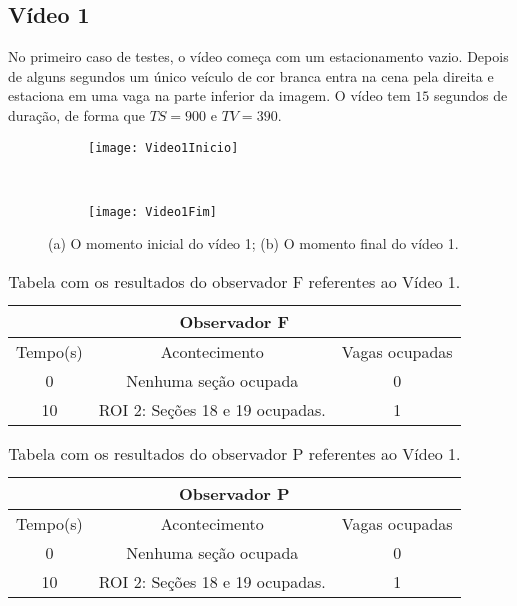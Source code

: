 \subsection{Vídeo 1}

No primeiro caso de testes, o vídeo começa com um estacionamento vazio. Depois de alguns segundos um único veículo de cor branca entra na cena pela direita e estaciona em uma vaga na parte inferior da imagem. O vídeo tem $15$ segundos de duração, de forma que $TS = 900$ e $TV = 390$.

\begin{figure}[H]
\centering
\begin{subfigure}{.5\textwidth}
\centering
\texttt{[image: Video1Inicio]}
\caption{}
\end{subfigure}\
\begin{subfigure}{.5\textwidth}
\centering
\texttt{[image: Video1Fim]}
\caption{}
\end{subfigure}
\centering
\caption{(a) O momento inicial do vídeo 1; (b) O momento final do vídeo 1.}%
\label{}%
\end{figure}

\begin{table}[H]
\begin{center}
\begin{tabular}{|c||c||c|}
\hline
\multicolumn{3}{|c|}{Observador F}  \\ \hline \hline
Tempo(s) & Acontecimento & Vagas ocupadas\\ \hline
0 & Nenhuma seção ocupada & 0 \\ \hline
10 & ROI 2: Seções 18 e 19 ocupadas. & 1 \\
\hline
\end{tabular}
\caption{Tabela com os resultados do observador F referentes ao Vídeo 1.}
\label{tab:video1F}
\end{center}
\end{table}

\begin{table}[H]
\begin{center}
\begin{tabular}{|c||c||c|}
\hline
\multicolumn{3}{|c|}{Observador P}  \\ \hline \hline
Tempo(s) & Acontecimento & Vagas ocupadas\\ \hline
0 & Nenhuma seção ocupada & 0 \\ \hline
10 & ROI 2: Seções 18 e 19 ocupadas. & 1 \\
\hline
\end{tabular}
\caption{Tabela com os resultados do observador P referentes ao Vídeo 1.}
\label{tab:video1F}
\end{center}
\end{table}


